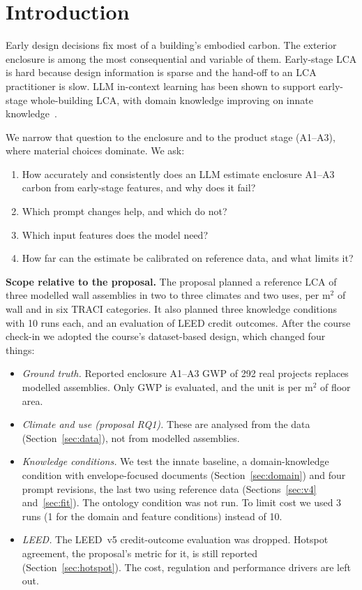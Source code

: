 \documentclass[10pt,letterpaper]{article}
\begin{document}
\section{Introduction}
Early design decisions fix most of a building's embodied carbon. The exterior enclosure is among the most consequential and variable of them. Early-stage LCA is hard because design information is sparse and the hand-off to an LCA practitioner is slow. LLM in-context learning has been shown to support early-stage whole-building LCA, with domain knowledge improving on innate knowledge~\cite{jung2026}.

We narrow that question to the enclosure and to the product stage (A1--A3), where material choices dominate. We ask:
\begin{enumerate}[label=\textbf{Q\arabic*}]
\item How accurately and consistently does an LLM estimate enclosure A1--A3 carbon from early-stage features, and why does it fail?
\item Which prompt changes help, and which do not?
\item Which input features does the model need?
\item How far can the estimate be calibrated on reference data, and what limits it?
\end{enumerate}

\textbf{Scope relative to the proposal.} The proposal planned a reference LCA of three modelled wall assemblies in two to three climates and two uses, per m$^2$ of wall and in six TRACI categories. It also planned three knowledge conditions with 10 runs each, and an evaluation of LEED credit outcomes. After the course check-in we adopted the course's dataset-based design, which changed four things:
\begin{itemize}
\item \emph{Ground truth.} Reported enclosure A1--A3 GWP of 292 real projects replaces modelled assemblies. Only GWP is evaluated, and the unit is per m$^2$ of floor area.
\item \emph{Climate and use (proposal RQ1).} These are analysed from the data (Section~\ref{sec:data}), not from modelled assemblies.
\item \emph{Knowledge conditions.} We test the innate baseline, a domain-knowledge condition with envelope-focused documents (Section~\ref{sec:domain}) and four prompt revisions, the last two using reference data (Sections~\ref{sec:v4} and~\ref{sec:fit}). The ontology condition was not run. To limit cost we used 3 runs (1 for the domain and feature conditions) instead of 10.
\item \emph{LEED.} The LEED~v5 credit-outcome evaluation was dropped. Hotspot agreement, the proposal's metric for it, is still reported (Section~\ref{sec:hotspot}). The cost, regulation and performance drivers are left out.
\end{itemize}
\end{document}
